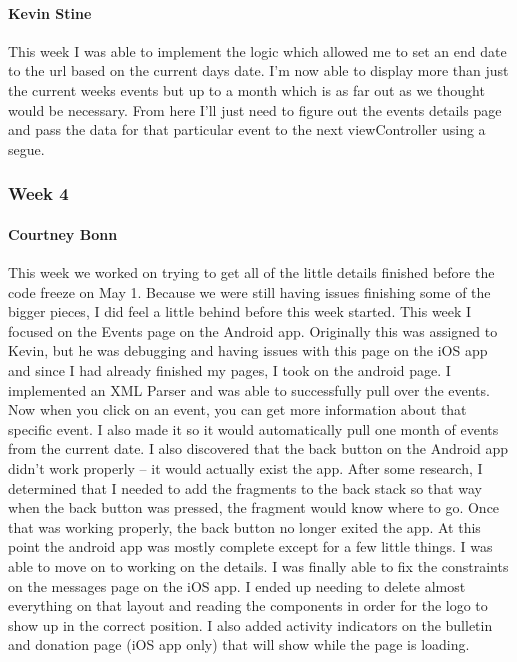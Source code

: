 			\paragraph{Kevin Stine}
			This week I was able to implement the logic which allowed me to set an end date to the url based on the current days date. I'm now able to display more than just the current weeks events but up to a month which is as far out as we thought would be necessary. From here I'll just need to figure out the events details page and pass the data for that particular event to the next viewController using a segue.

		\subsubsection{Week 4}

			\paragraph{Courtney Bonn}
			This week we worked on trying to get all of the little details finished before the code freeze on May 1. Because we were still having issues finishing some of the bigger pieces, I did feel a little behind before this week started. This week I focused on the Events page on the Android app. Originally this was assigned to Kevin, but he was debugging and having issues with this page on the iOS app and since I had already finished my pages, I took on the android page. I implemented an XML Parser and was able to successfully pull over the events. Now when you click on an event, you can get more information about that specific event. I also made it so it would automatically pull one month of events from the current date. I also discovered that the back button on the Android app didn't work properly -- it would actually exist the app. After some research, I determined that I needed to add the fragments to the back stack so that way when the back button was pressed, the fragment would know where to go. Once that was working properly, the back button no longer exited the app. At this point the android app was mostly complete except for a few little things. I was able to move on to working on the details. I was finally able to fix the constraints on the messages page on the iOS app. I ended up needing to delete almost everything on that layout and reading the components in order for the logo to show up in the correct position. I also added activity indicators on the bulletin and donation page (iOS app only) that will show while the page is loading.

